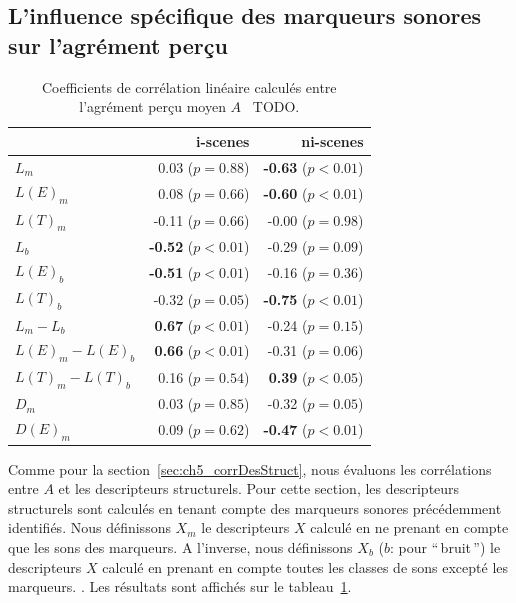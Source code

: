 \subsection{L'influence spécifique des marqueurs sonores sur l'agrément perçu}

\begin{table}[t]
\centering
\begin{tabular}{l r r} 
               &   i-scenes                   & ni-scenes \\
\hline
$L_m$            & 0.03  ($p=0.88$)           & \textbf{-0.63} ($p<0.01$) \\
$L(E)_m$           & 0.08  ($p=0.66$)           & \textbf{-0.60} ($p<0.01$) \\
$L(T)_m$           & -0.11 ($p=0.66$)           & -0.00 ($p=0.98$) \\
$L_b$            & \textbf{-0.52} ($p<0.01$)  & -0.29 ($p=0.09$) \\
$L(E)_b$           & \textbf{-0.51} ($p<0.01$)  & -0.16 ($p=0.36$) \\
$L(T)_b$           & -0.32 ($p=0.05$)           & \textbf{-0.75} ($p<0.01$) \\
$L_m-L_b$        & \textbf{0.67} ($p<0.01$)   & -0.24 ($p=0.15$) \\
$L(E)_m-L(E)_b$      & \textbf{0.66} ($p<0.01$)   & -0.31 ($p=0.06$) \\
$L(T)_m-L(T)_b$      & 0.16 ($p=0.54$)            & \textbf{0.39} ($p<0.05$) \\
$D_m$            & 0.03 ($p=0.85$)            & -0.32 ($p=0.05$) \\
$D(E)_m$           & 0.09  ($p=0.62$)           & \textbf{-0.47} ($p<0.01$) \\
\hline
\end{tabular}
\vspace{0.5mm}
\caption{Coefficients de corrélation linéaire calculés entre l'agrément perçu moyen $A$ \vs~TODO.}
\label{tab:corrMarkers}
\end{table}

Comme pour la  section~\ref{sec:ch5_corrDesStruct}, nous évaluons les corrélations entre $A$ et les descripteurs structurels. Pour cette section, les descripteurs structurels sont calculés en tenant compte des marqueurs sonores précédemment identifiés. Nous définissons $X_m$ le descripteurs $X$ calculé en ne prenant en compte que les sons des marqueurs. A l'inverse, nous définissons $X_b$ ($b$: pour ``\,bruit\,'') le descripteurs $X$ calculé en prenant en compte toutes les classes de sons excepté les marqueurs.  . Les résultats sont affichés sur le tableau~\ref{tab:corrMarkers}.

